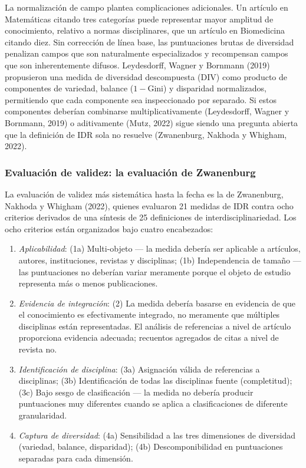 \documentclass[
]{article}
\providecommand{\tightlist}{%
  \setlength{\itemsep}{0pt}\setlength{\parskip}{0pt}}
\begin{document}
La normalización de campo plantea complicaciones adicionales. Un
artículo en Matemáticas citando tres categorías puede representar mayor
amplitud de conocimiento, relativo a normas disciplinares, que un
artículo en Biomedicina citando diez. Sin corrección de línea base, las
puntuaciones brutas de diversidad penalizan campos que son naturalmente
especializados y recompensan campos que son inherentemente difusos.
Leydesdorff, Wagner y Bornmann (2019) propusieron una medida de
diversidad descompuesta (DIV) como producto de componentes de variedad,
balance (\(1 - \text{Gini}\)) y disparidad normalizados, permitiendo que
cada componente sea inspeccionado por separado. Si estos componentes
deberían combinarse multiplicativamente (Leydesdorff, Wagner y Bornmann,
2019) o aditivamente (Mutz, 2022) sigue siendo una pregunta abierta que
la definición de IDR sola no resuelve (Zwanenburg, Nakhoda y Whigham,
2022).

\hypertarget{evaluaciuxf3n-de-validez-la-evaluaciuxf3n-de-zwanenburg}{%
\subsubsection{Evaluación de validez: la evaluación de
Zwanenburg}\label{evaluaciuxf3n-de-validez-la-evaluaciuxf3n-de-zwanenburg}}

La evaluación de validez más sistemática hasta la fecha es la de
Zwanenburg, Nakhoda y Whigham (2022), quienes evaluaron 21 medidas de
IDR contra ocho criterios derivados de una síntesis de 25 definiciones
de interdisciplinariedad. Los ocho criterios están organizados bajo
cuatro encabezados:

\begin{enumerate}
\def\labelenumi{\arabic{enumi}.}
\tightlist
\item
  \emph{Aplicabilidad}: (1a) Multi-objeto --- la medida debería ser
  aplicable a artículos, autores, instituciones, revistas y disciplinas;
  (1b) Independencia de tamaño --- las puntuaciones no deberían variar
  meramente porque el objeto de estudio representa más o menos
  publicaciones.
\item
  \emph{Evidencia de integración}: (2) La medida debería basarse en
  evidencia de que el conocimiento es efectivamente integrado, no
  meramente que múltiples disciplinas están representadas. El análisis
  de referencias a nivel de artículo proporciona evidencia adecuada;
  recuentos agregados de citas a nivel de revista no.
\item
  \emph{Identificación de disciplina}: (3a) Asignación válida de
  referencias a disciplinas; (3b) Identificación de todas las
  disciplinas fuente (completitud); (3c) Bajo sesgo de clasificación ---
  la medida no debería producir puntuaciones muy diferentes cuando se
  aplica a clasificaciones de diferente granularidad.
\item
  \emph{Captura de diversidad}: (4a) Sensibilidad a las tres dimensiones
  de diversidad (variedad, balance, disparidad); (4b) Descomponibilidad
  en puntuaciones separadas para cada dimensión.
\end{enumerate}
\end{document}
